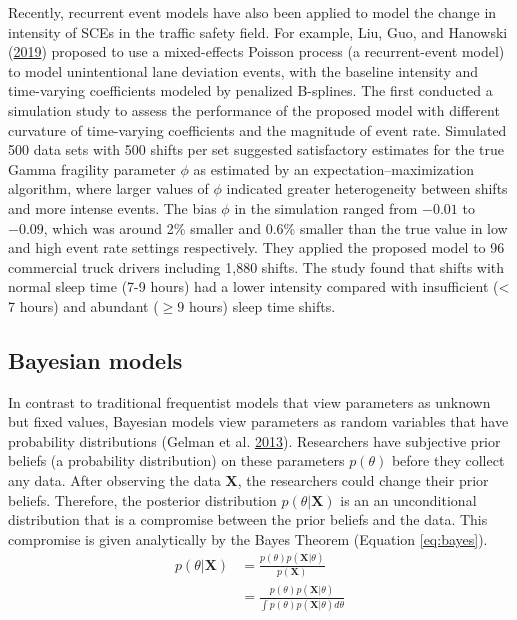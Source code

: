 \documentclass[12pt]{book}
\numberwithin{equation}{chapter}
\begin{document}
Recently, recurrent event models have also been applied to model the change in intensity of SCEs in the traffic safety field. For example, Liu, Guo, and Hanowski (\protect\hyperlink{ref-liu2019assessing}{2019}) proposed to use a mixed-effects Poisson process (a recurrent-event model) to model unintentional lane deviation events, with the baseline intensity and time-varying coefficients modeled by penalized B-splines. The first conducted a simulation study to assess the performance of the proposed model with different curvature of time-varying coefficients and the magnitude of event rate. Simulated 500 data sets with 500 shifts per set suggested satisfactory estimates for the true Gamma fragility parameter \(\phi\) as estimated by an expectation--maximization algorithm, where larger values of \(\phi\) indicated greater heterogeneity between shifts and more intense events. The bias \(\phi\) in the simulation ranged from \(-0.01\) to \(-0.09\), which was around 2\% smaller and 0.6\% smaller than the true value in low and high event rate settings respectively. They applied the proposed model to 96 commercial truck drivers including 1,880 shifts. The study found that shifts with normal sleep time (7-9 hours) had a lower intensity compared with insufficient (\textless{} 7 hours) and abundant (\(\geq 9\) hours) sleep time shifts.

\hypertarget{bayesian-models}{%
\subsection{Bayesian models}\label{bayesian-models}}

In contrast to traditional frequentist models that view parameters as unknown but fixed values, Bayesian models view parameters as random variables that have probability distributions (Gelman et al. \protect\hyperlink{ref-gelman2013bayesian}{2013}). Researchers have subjective prior beliefs (a probability distribution) on these parameters \(p(\theta)\) before they collect any data. After observing the data \(\mathbf{X}\), the researchers could change their prior beliefs. Therefore, the posterior distribution \(p(\theta | \mathbf{X})\) is an an unconditional distribution that is a compromise between the prior beliefs and the data. This compromise is given analytically by the Bayes Theorem (Equation \eqref{eq:bayes}).
\begin{equation}
\begin{split}
p(\theta | \mathbf{X}) & = \frac{p(\theta)p(\mathbf{X}|\theta)}{p(\mathbf{X})} \\
 & = \frac{p(\theta)p(\mathbf{X}|\theta )}{\int p(\theta)p(\mathbf{X}|\theta)d\theta}
\label{eq:bayes}
\end{split}
\end{equation}
\end{document}
